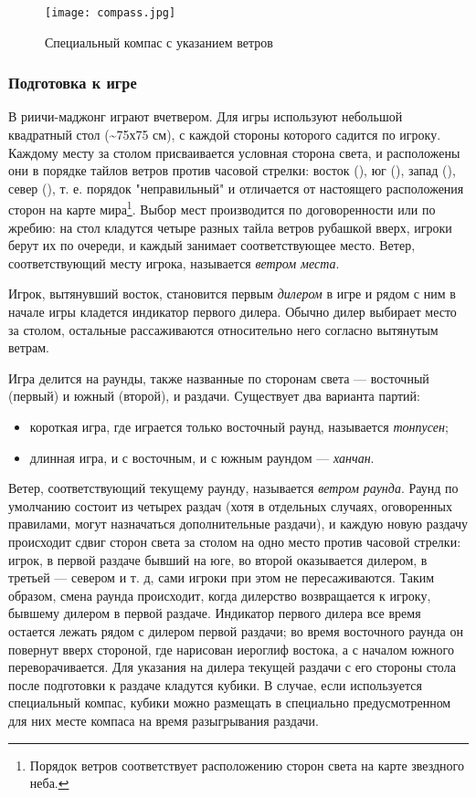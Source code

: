 \begin{figure}[H]
	\centering
	\texttt{[image: compass.jpg]}
	\caption{Специальный компас с указанием ветров}
\end{figure}

\subsubsection{Подготовка к игре}

В риичи-маджонг играют вчетвером. Для игры используют небольшой квадратный стол (\sim75х75 см), с каждой стороны которого садится по игроку. Каждому месту за столом присваивается условная сторона света, и расположены они в порядке тайлов ветров против часовой стрелки: восток (), юг (), запад (), север (), т. е. порядок "неправильный" и отличается от настоящего расположения сторон на карте мира\footnote{Порядок ветров соответствует расположению сторон света на карте звездного неба.}. Выбор мест производится по договоренности или по жребию: на стол кладутся четыре разных тайла ветров рубашкой вверх, игроки берут их по очереди, и каждый занимает соответствующее место. Ветер, соответствующий месту игрока, называется \textit{ветром места}. 

Игрок, вытянувший восток, становится первым \textit{дилером} в игре и рядом с ним в начале игры кладется индикатор первого дилера. Обычно дилер выбирает место за столом, остальные рассаживаются относительно него согласно вытянутым ветрам.

Игра делится на раунды, также названные по сторонам света --- восточный (первый) и южный (второй), и раздачи. Существует два варианта партий:
\begin{itemize}
	\item короткая игра, где играется только восточный раунд, называется \textit{тонпусен};
	\item длинная игра, и с восточным, и с южным раундом --- \textit{ханчан}.
\end{itemize}
Ветер, соответствующий текущему раунду, называется \textit{ветром раунда}. Раунд по умолчанию состоит из четырех раздач (хотя в отдельных случаях, оговоренных правилами, могут назначаться дополнительные раздачи), и каждую новую раздачу происходит сдвиг сторон света за столом на одно место против часовой стрелки: игрок, в первой раздаче бывший на юге, во второй оказывается дилером, в третьей --- севером и т. д, сами игроки при этом не пересаживаются. Таким образом, смена раунда происходит, когда дилерство возвращается к игроку, бывшему дилером в первой раздаче. Индикатор первого дилера все время остается лежать рядом с дилером первой раздачи; во время восточного раунда он повернут вверх стороной, где нарисован иероглиф востока, а с началом южного переворачивается. Для указания на дилера текущей раздачи с его стороны стола после подготовки к раздаче кладутся кубики. В случае, если используется специальный компас, кубики можно размещать в специально предусмотренном для них месте компаса на время разыгрывания раздачи.

